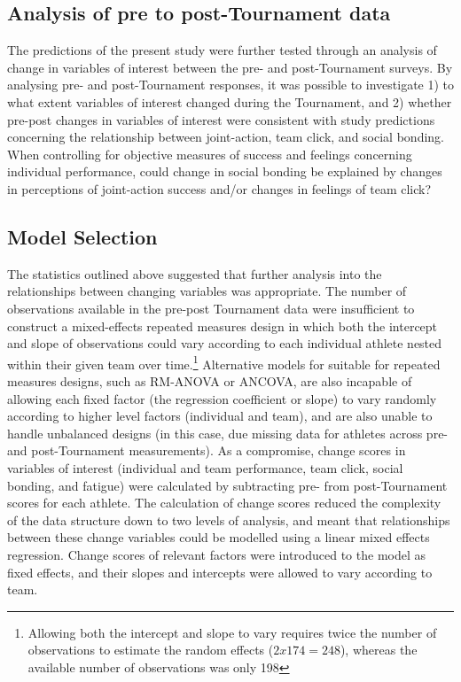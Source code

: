 {\clearpage






\subsection{Analysis of pre to post-Tournament data}
The predictions of the present study were further tested through an analysis of change in variables of interest between the pre- and post-Tournament surveys. By analysing pre- and post-Tournament responses, it was possible to investigate 1) to what extent variables of interest changed during the Tournament, and 2) whether pre-post changes in variables of interest were consistent with study predictions concerning the relationship between joint-action, team click, and social bonding.  When controlling for objective measures of success and feelings concerning individual performance, could change in social bonding be explained by changes in perceptions of joint-action success and/or changes in feelings of team click?




\subsection{Model Selection}
The statistics outlined above suggested that further analysis into the relationships between changing variables was appropriate. The number of observations available in the pre-post Tournament data were insufficient to construct a mixed-effects repeated measures design in which both the intercept and slope of observations could vary according to each individual athlete nested within their given team over time.\footnote{Allowing both the intercept and slope to vary requires twice the number of observations to estimate the random effects ($2x174 = 248$), whereas the available number of observations was only 198} Alternative models for suitable for repeated measures designs, such as RM-ANOVA or ANCOVA, are also incapable of allowing each fixed factor (the regression coefficient or slope) to vary randomly according to higher level factors (individual and team), and are also unable to handle unbalanced designs (in this case, due missing data for athletes across pre- and post-Tournament measurements). As a compromise, change scores in variables of interest (individual and team performance, team click, social bonding, and fatigue) were calculated by subtracting pre- from post-Tournament scores for each athlete. The calculation of change scores reduced the complexity of the data structure down to two levels of analysis, and meant that relationships between these change variables could be modelled using a linear mixed effects regression. Change scores of relevant factors were introduced to the model as fixed effects, and their slopes and intercepts were allowed to vary according to team.

}
